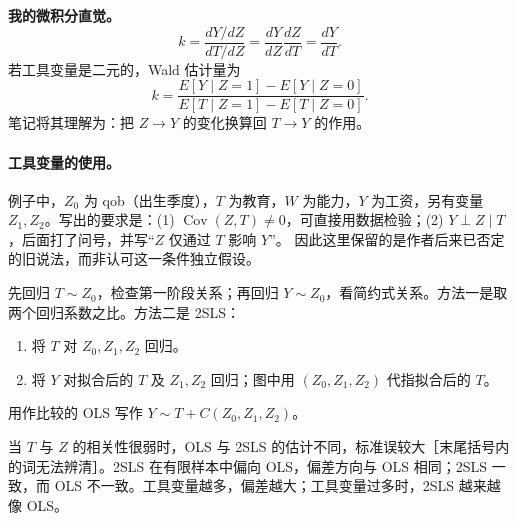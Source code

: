{\textbf{我的微积分直觉。}
\[k=\frac{dY/dZ}{dT/dZ}=\frac{dY}{dZ}\frac{dZ}{dT}=\frac{dY}{dT}.\]
若工具变量是二元的，Wald 估计量为
\[k=\frac{E[Y\mid Z=1]-E[Y\mid Z=0]}{E[T\mid Z=1]-E[T\mid Z=0]}.\]
笔记将其理解为：把 $Z\to Y$ 的变化换算回 $T\to Y$ 的作用。

\paragraph{工具变量的使用。}
例子中，$Z_0$ 为 qob（出生季度），$T$ 为教育，$W$ 为能力，$Y$ 为工资，另有变量 $Z_1,Z_2$。写出的要求是：(1) $\operatorname{Cov}(Z,T)\ne0$，可直接用数据检验；(2) $Y\perp Z\mid T$，后面打了问号，并写“$Z$ 仅通过 $T$ 影响 $Y$”。 因此这里保留的是作者后来已否定的旧说法，而非认可这一条件独立假设。

先回归 $T\sim Z_0$，检查第一阶段关系；再回归 $Y\sim Z_0$，看简约式关系。方法一是取两个回归系数之比。方法二是 2SLS：
\begin{enumerate}
\item 将 $T$ 对 $Z_0,Z_1,Z_2$ 回归。
\item 将 $Y$ 对拟合后的 $T$ 及 $Z_1,Z_2$ 回归；图中用 $(Z_0,Z_1,Z_2)$ 代指拟合后的 $T$。
\end{enumerate}
 用作比较的 OLS 写作 $Y\sim T+C(Z_0,Z_1,Z_2)$。

当 $T$ 与 $Z$ 的相关性很弱时，OLS 与 2SLS 的估计不同，标准误较大［末尾括号内的词无法辨清］。2SLS 在有限样本中偏向 OLS，偏差方向与 OLS 相同；2SLS 一致，而 OLS 不一致。工具变量越多，偏差越大；工具变量过多时，2SLS 越来越像 OLS。

\begin{center}
\end{center}}
